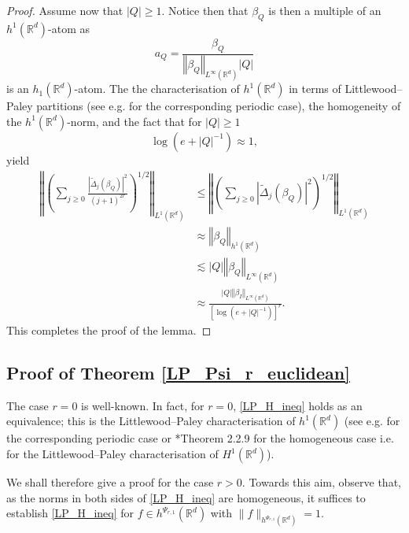 \documentclass[a4paper, leqno, 10pt]{amsart}
\numberwithin{equation}{section}
\newcommand{\R}{\mathbb{R}}
\newcommand{\norm}[1]{\left\Vert#1\right\Vert}
\newcommand{\abs}[1]{\left|#1\right|}
\begin{document}
\begin{proof}
Assume now that $\abs{Q}\geq 1$. Notice then that $\beta_Q$ is then a multiple of an $h^1(\R^d)$-atom as
\[
a_Q=\frac{\beta_Q}{\norm{\beta_Q}_{L^\infty(\R^d)}\abs{Q}}
\]
is an $h_1(\R^d)$-atom. The the characterisation of $h^1(\R^d)$ in terms of Littlewood--Paley partitions (see e.g. \cite{Stein_mult} for the corresponding periodic case), the homogeneity of the $h^1(\R^d)$-norm, and the fact that for $\abs{Q}\geq 1$
\[
\log(e+\abs{Q}^{-1})\approx 1,
\]
yield
\begin{align*}
\norm{ \left( \sum_{j \geq 0} \frac{ | \widetilde{\Delta}_j ( \beta_Q )  |^2}{(j+1)^{2r}} \right)^{1/2} }_{L^1 (\R^d)} &\leq \norm{ \left( \sum_{j \geq 0} | \widetilde{\Delta}_j ( \beta_Q ) |^2 \right)^{1/2} }_{L^1 (\R^d)}\\
&\approx\norm{\beta_Q}_{h^1(\R^d)}\\
&\lesssim | Q | \norm{ \beta_Q }_{L^{\infty} (\R^d)} \\
& \approx \frac{ | Q |\norm{ \beta_I }_{L^{\infty} (\R^d)}} { \left[ \log \left(e + |Q|^{-1} \right) \right]^r }.        
\end{align*}
This completes the proof of the lemma. \end{proof}


\subsection*{Proof of Theorem \ref{LP_Psi_r_euclidean}} The case $r=0$ is well-known. In fact, for $r=0$, \eqref{LP_H_ineq} holds as an equivalence; this is the Littlewood--Paley characterisation of $h^1 (\R^d)$ (see e.g. \cite{Stein_mult} for the corresponding periodic case or \cite{Grafakos_modern}*{Theorem 2.2.9} for the homogeneous case i.e. for the Littlewood--Paley characterisation of $H^1 (\R^d)$).

We shall therefore give a proof for the case $r >0$. 
Towards this aim, observe that, as the norms in both sides of \eqref{LP_H_ineq} are homogeneous, it suffices to establish \eqref{LP_H_ineq} for $f \in h^{\Psi_{r,1}} (\R^d)$  with $\| f \|_{h^{\Psi_{r,1}} (\R^d)} = 1$. 
\end{document}
